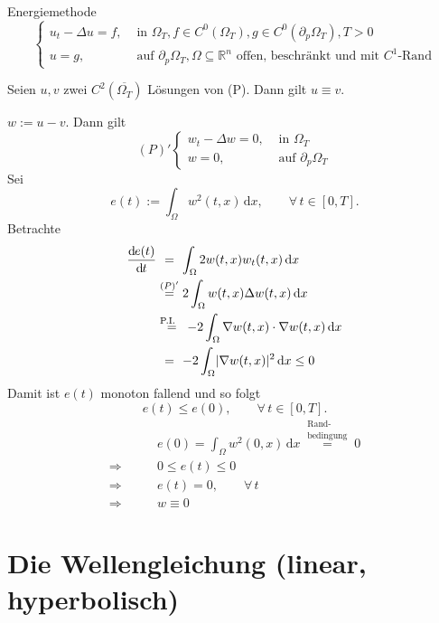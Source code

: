 Energiemethode 
\[
	\begin{cases}
		u_t - \Delta u = f, &\text{ in }\Omega_T, f \in C^0(\Omega_T), g \in C^0(\partial_p \Omega_T), T >0\\
		u = g ,&\text{ auf } \partial_p \Omega_T, \Omega \subseteq \mathbb{R}^n \text{ offen, beschränkt und mit $C^1$-Rand}
	\end{cases}
\]
\begin{satz}
	Seien $u,v$ zwei $C^2(\overline{\Omega_T})$ Lösungen von (P). Dann gilt $u \equiv v$.
\end{satz}
\begin{beweis}
	$w:= u -v$. Dann gilt 
	\[
		(P)'\begin{cases}
			w_t -\Delta w = 0, &\text{ in }\Omega_T\\
			w = 0, &\text{ auf } \partial_p \Omega_T
		\end{cases}
	\]
	Sei
	\[
		e(t):= \int_{\Omega}^{} w^2(t,x) \,\mathrm{d}x, \qquad \forall\, t \in [0,T].
	\]
	Betrachte
	\begin{align*}
		\frac{\mathrm{d}\mkern-1.0mu e(t)}{\mathrm{d}\mkern-1.0mu t}  & \stackrel{\hphantom{(P)'}}{=} \int_{\Omega}^{} 2 w(t,x) w_t(t,x) \,\mathrm{d}x  \\
		&\stackrel{(P)'}{=} 2 \int_{\Omega}^{} w(t,x) \Delta w(t,x) \,\mathrm{d}x \\
		&\stackrel{\text{P.I.\hphantom{...}}}{=} -2 \int_{\Omega}^{}  \nabla  w(t,x) \cdot  \nabla w(t,x) \,\mathrm{d}x \\
		&\stackrel{\hphantom{(P)'}}{=} -2 \int_{\Omega}^{} \lvert \nabla w(t,x)\rvert^2 \,\mathrm{d}x \leq 0
	\end{align*}
	Damit ist $e(t)$ monoton fallend und so folgt
	\[
		e(t) \leq e(0), \qquad \forall\, t \in [0,T].
	\]
	\begin{align*}
		& \qquad e(0) = \int_{\Omega}^{} w^2(0,x) \,\mathrm{d}x \stackrel{\substack{\text{Rand-}\\\text{bedingung}}}{=} 0 \\
		\Rightarrow& \qquad 0 \leq e(t) \leq 0 \\
		\Rightarrow & \qquad  e(t) = 0, \qquad \forall\, t \\
		\Rightarrow & \qquad  w \equiv 0  
	\end{align*}
\end{beweis}
\newpage
\section{Die Wellengleichung (linear, hyperbolisch)} 
\label{sec:die_wellengleichung_linear_hyperbolisch}

